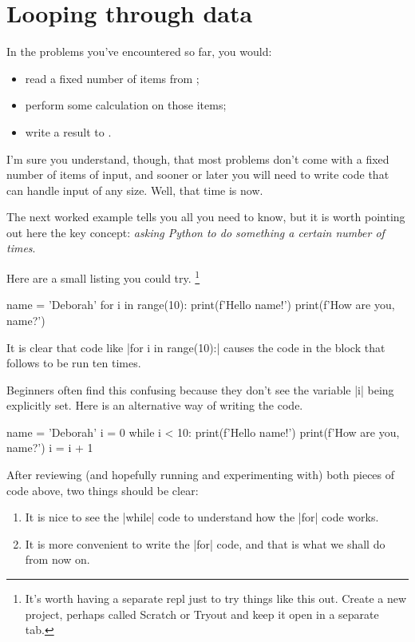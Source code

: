 
\chapter{Looping through data}

In the problems you've encountered so far, you would:
\begin{itemize}
  \item read a fixed number of items from \IN;
  \item perform some calculation on those items;
  \item write a result to \OUT.
\end{itemize}

I'm sure you understand, though, that most problems don't come with a fixed number of
items of input, and sooner or later you will need to write code that can handle input of
any size. Well, that time is now.

The next worked example tells you all you need to know, but it is worth pointing out here
the key concept: \emph{asking Python to do something a certain number of times}.

Here are a small listing you could try.%
\footnote{It's worth having a separate repl just to try things like this out. Create a new
project, perhaps called \textsf{Scratch} or \textsf{Tryout} and keep it open in a separate
tab.}

\begin{pythoncode}
  name = 'Deborah'
  for i in range(10):
    print(f'Hello {name}!')
    print(f'How are you, {name}?')
\end{pythoncode}

It is clear that code like \pycode|for i in range(10):| causes the code in the block that
follows to be run ten times.

Beginners often find this confusing because they don't see the variable \pycode|i|
being explicitly set. Here is an alternative way of writing the code.

\begin{pythoncode}
  name = 'Deborah'
  i = 0
  while i < 10:
    print(f'Hello {name}!')
    print(f'How are you, {name}?')
    i = i + 1
\end{pythoncode}

After reviewing (and hopefully running and experimenting with) both pieces of code above,
two things should be clear:
\begin{enumerate}
  \item It is nice to see the \pycode|while| code to understand how the \pycode|for| code
    works.
  \item It is more convenient to write the \pycode|for| code, and that is what we shall do
    from now on.
\end{enumerate}


